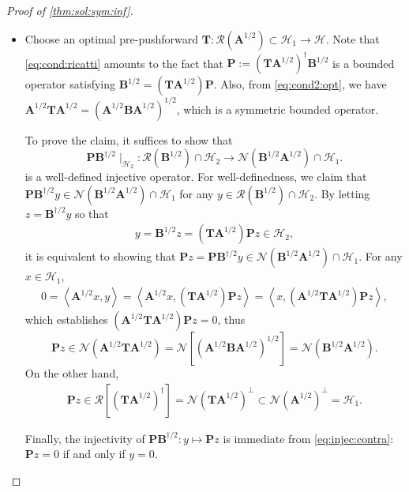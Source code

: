 \documentclass[10pt,a4paper]{amsart}
\newcommand{\innpr}[2]{{\left\langle {#1},{#2}\right\rangle}} %
\newcommand{\m}[1]{\mathbf{#1}} %
\renewcommand{\c}[1]{\mathcal{#1}} %
\begin{document}
\begin{proof}[Proof of \cref{thm:sol:sym:inf}]
\quad
\begin{itemize}[leftmargin = *]
\item [($\Rightarrow$)] Choose an optimal pre-pushforward $\m{T}: \c{R}(\m{A}^{1/2}) \subset \c{H}_{1} \rightarrow \c{H}$. Note that \eqref{eq:cond:ricatti} amounts to the fact that $\m{P} := (\m{T} \m{A}^{1/2})^{\dagger} \m{B}^{1/2}$ is a bounded operator satisfying $\m{B}^{1/2} = (\m{T} \m{A}^{1/2}) \m{P}$. Also, from \eqref{eq:cond2:opt}, we have $\m{A}^{1/2} \m{T} \m{A}^{1/2} = (\m{A}^{1/2} \m{B} \m{A}^{1/2})^{1/2}$, which is a symmetric bounded operator.

To prove the claim, it suffices to show that
\begin{equation*}
    \m{P} \m{B}^{\dagger/2} \mid_{\c{H}_{2}} : \c{R}(\m{B}^{1/2}) \cap \c{H}_{2} \rightarrow \c{N}(\m{B}^{1/2} \m{A}^{1/2}) \cap \c{H}_{1}.
\end{equation*}
is a well-defined injective operator. For well-definedness, we claim that $\m{P} \m{B}^{\dagger/2} y \in \c{N}(\m{B}^{1/2} \m{A}^{1/2}) \cap \c{H}_{1}$ for any $y \in \c{R}(\m{B}^{1/2}) \cap \c{H}_{2}$. By letting $z = \m{B}^{\dagger/2} y$ so that
\begin{align}\label{eq:injec:contra}
    y = \m{B}^{1/2} z = (\m{T} \m{A}^{1/2}) \m{P} z \in \c{H}_{2},
\end{align}
it is equivalent to showing that $\m{P} z = \m{P} \m{B}^{\dagger/2} y \in \c{N}(\m{B}^{1/2} \m{A}^{1/2}) \cap \c{H}_{1}$. For any $x \in \c{H}_{1}$,
\begin{align*}
    0 = \innpr{\m{A}^{1/2} x}{y} = \innpr{\m{A}^{1/2} x}{(\m{T} \m{A}^{1/2}) \m{P} z}
    = \innpr{x}{(\m{A}^{1/2} \m{T} \m{A}^{1/2}) \m{P} z},
\end{align*}
which establishes $(\m{A}^{1/2} \m{T} \m{A}^{1/2}) \m{P} z  = 0$, thus 
\begin{equation*}
    \m{P} z \in \c{N} (\m{A}^{1/2} \m{T} \m{A}^{1/2}) = \c{N}[(\m{A}^{1/2} \m{B} \m{A}^{1/2})^{1/2}] = \c{N}(\m{B}^{1/2} \m{A}^{1/2}).
\end{equation*}
On the other hand,
\begin{align*}
    \m{P} z \in \c{R}[(\m{T} \m{A}^{1/2})^{\dagger}] = \c{N}(\m{T} \m{A}^{1/2})^{\perp} \subset \c{N}(\m{A}^{1/2})^{\perp} = \c{H}_{1}.
\end{align*}

Finally, the injectivity of $\m{P} \m{B}^{\dagger/2}: y \mapsto \m{P} z$ is immediate from \eqref{eq:injec:contra}: $\m{P} z = 0$ if and only if $y = 0$.


\end{itemize}
\end{proof}
\end{document}
